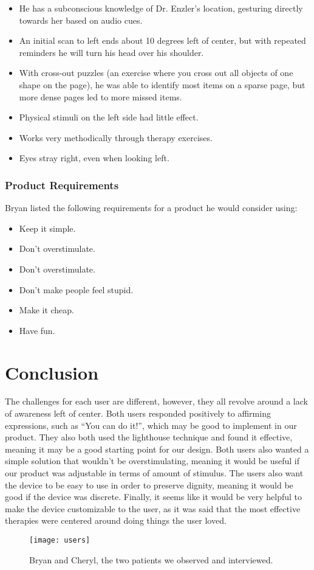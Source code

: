 \begin{itemize}
\item He has a subconscious knowledge of Dr. Enzler’s location, gesturing
  directly towards her based on audio cues.
\item An initial scan to left ends about 10 degrees left of center, but with
  repeated reminders he will turn his head over his shoulder.
\item With cross-out puzzles (an exercise where you cross out all objects of
  one shape on the page), he was able to identify most items on a sparse page,
  but more dense pages led to more missed items.
\item Physical stimuli on the left side had little effect.
\item Works very methodically through therapy exercises.
\item Eyes stray right, even when looking left. 
\end{itemize}

\subsubsection{Product Requirements}

Bryan listed the following requirements for a product he would consider using:
\begin{itemize}
\item Keep it simple.
\item Don’t overstimulate.
\item Don’t overstimulate.
\item Don’t make people feel stupid.
\item Make it cheap.
\item Have fun.
\end{itemize}

\section{Conclusion}
The challenges for each user are different, however, they all revolve around a
lack of awareness left of center. Both users responded positively to affirming
expressions, such as “You can do it!”, which may be good to implement in our
product. They also both used the lighthouse technique and found it effective,
meaning it may be a good starting point for our design. Both users also wanted
a simple solution that wouldn’t be overstimulating, meaning it would be useful
if our product was adjustable in terms of amount of stimulus.  The users also
want the device to be easy to use in order to preserve dignity, meaning it
would be good if the device was discrete. Finally, it seems like it would be
very helpful to make the device customizable to the user, as it was said that
the most effective therapies were centered around doing things the user loved.

\begin{figure}[h]
  \centering
  \texttt{[image: users]}
  \caption{Bryan and Cheryl, the two patients we observed and interviewed.}
\end{figure}

